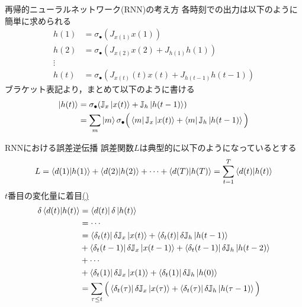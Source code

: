 \documentclass[dvipdfmx,10pt]{beamer}
\begin{document}
  \begin{frame}[t]{再帰的ニューラルネットワーク(RNN)の考え方}
    各時刻での出力は以下のように簡単に求められる
    \begin{align*}
      h(1) &= \sigma_{\bullet}(J_{x(1)}x(1))\\
      h(2) &= \sigma_{\bullet}(J_{x(2)}x(2) + J_{h(1)}h(1))\\
      \vdots\\
      h(t) &= \sigma_{\bullet}(J_{x(t)}(t)x(t) + J_{h(t-1)}h(t-1))
    \end{align*}
    ブラケット表記より，まとめて以下のように書ける
    \begin{align*}
      \ket{h(t)} &= \sigma_{\bullet}(\mathbb{J}_x\ket{x(t)} + \mathbb{J}_h\ket{h(t-1)})\\
      &= \sum_{m}\ket{m}\sigma_{\bullet}\Big(\bra{m}\mathbb{J}_x\ket{x(t)} + \bra{m}\mathbb{J}_h\ket{h(t-1)}\Big)
    \end{align*}
  \end{frame}

  \begin{frame}{RNNにおける誤差逆伝播}
    誤差関数$L$は典型的に以下のようになっているとする
    \begin{equation*}
      L = \braket{d(1)|h(1)} + \braket{d(2)|h(2)} + \cdots + \braket{d(T)|h(T)}= \sum_{t=1}^{T}\braket{d(t)|h(t)}
    \end{equation*}
    $t$番目の変化量に着目\hyperlink{計算1}{()}
    \begin{align*}
      \delta \braket{d(t)|h(t)} 
      &= \bra{d(t)} \delta \ket{h(t)} \ \\
      &= \cdots\\
      &= \bra{\delta_t (t)}\delta \mathbb{J}_x \ket{x(t)} + \bra{\delta_t (t)}\delta \mathbb{J}_h \ket{h(t-1)}\\
      &+ \bra{\delta_t (t-1)}\delta \mathbb{J}_x \ket{x(t-1)} + \bra{\delta_t (t-1)}\delta \mathbb{J}_h \ket{h(t-2)}\\
      &+ \cdots\\
      &+ \bra{\delta_t (1)}\delta \mathbb{J}_x \ket{x(1)} + \bra{\delta_t (1)}\delta \mathbb{J}_h \ket{h(0)}\\
      &= \sum_{\tau \leq t} \Big(\bra{\delta_t (\tau)}\delta \mathbb{J}_x \ket{x(\tau)} + \bra{\delta_t (\tau)}\delta \mathbb{J}_h \ket{h(\tau-1)} \Big)
    \end{align*}
    
  \end{frame}
\end{document}
